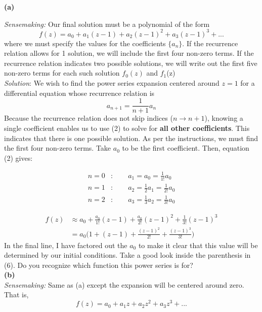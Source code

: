 \documentclass{article}
\begin{document}
\noindent\textbf{(a)}

\noindent \textit{Sensemaking:} Our final solution must be a polynomial of the
form
\begin{equation}
  f(z) = a_0 + a_1 (z-1) + a_2 (z-1)^2+ a_3 (z-1)^3+...
\end{equation}
where  we must specify the values for the coefficients $\{a_n\}$. If the
recurrence relation allows for 1 solution, we will include the first four non-zero
terms. If the recurrence relation indicates two possible solutions, we will
write out the first five non-zero terms for each such solution $f_0(z)$ and $f_1$(z)\vspace{3em}\\ 

\noindent\textit{Solution}: 
\noindent We wish to find the power series expansion centered around $z=1$ for a
differential equation whose recurrence relation is
\begin{equation}
  a_{n+1}=\frac{1}{n+1}a_n
\end{equation}
Because the recurrence relation does not skip indices ($n\to n+1$), knowing a single
coefficient enables us to use (2) to solve for \textbf{all other coefficients}.
This indicates that there is one possible solution. As per the instructions, we
must find the first four non-zero terms. Take $a_0$ to be the first coefficient.
Then, equation (2) gives:

\begin{align}
  n=0 &:\qquad a_1 = a_0= \frac{1}{1!}a_0 \\
  n=1 &:\qquad a_2 = \frac{1}{2}a_1 = \frac{1}{2!}a_0 \\
  n=2 &:\qquad a_3 = \frac{1}{3}a_2 = \frac{1}{3!}a_0
\end{align}

\begin{align}
  f(z) &\approx a_0 + \frac{a_0}{1!}(z-1)+\frac{a_0}{2!}(z-1)^2+\frac{1}{3!}(z-1)^3 \nonumber\\
  &= a_0\Bigg(1+(z-1)+\frac{(z-1)^2}{2!}+\frac{(z-1)^3}{3!}\Bigg)
\end{align}
In the final line, I have factored out the $a_0$ to make it clear that this
value will be determined by our initial conditions. Take a good look inside the
parenthesis in (6). Do you recognize which function this power series is for? \\


\noindent\textbf{(b)}\\

\noindent \textit{Sensemaking:} Same as (a) except the expansion will be centered
around zero. That is,
\begin{equation}
  f(z) = a_0+a_1z+a_2z^2+a_3z^3+ ...
\end{equation}
\\
\end{document}
